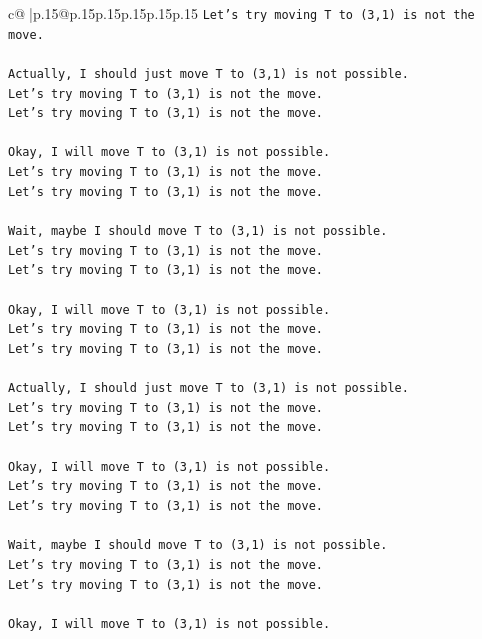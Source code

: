 \documentclass{article}
\begin{document}
{\begin{supertabular}{c@{$\;$}|p{.15\linewidth}@{}p{.15\linewidth}p{.15\linewidth}p{.15\linewidth}p{.15\linewidth}p{.15\linewidth}}
{{{\texttt{Let's try moving T to (3,1) is not the move.} \\
\\ 
\texttt{Actually, I should just move T to (3,1) is not possible.} \\
\texttt{Let's try moving T to (3,1) is not the move.} \\
\texttt{Let's try moving T to (3,1) is not the move.} \\
\\ 
\texttt{Okay, I will move T to (3,1) is not possible.} \\
\texttt{Let's try moving T to (3,1) is not the move.} \\
\texttt{Let's try moving T to (3,1) is not the move.} \\
\\ 
\texttt{Wait, maybe I should move T to (3,1) is not possible.} \\
\texttt{Let's try moving T to (3,1) is not the move.} \\
\texttt{Let's try moving T to (3,1) is not the move.} \\
\\ 
\texttt{Okay, I will move T to (3,1) is not possible.} \\
\texttt{Let's try moving T to (3,1) is not the move.} \\
\texttt{Let's try moving T to (3,1) is not the move.} \\
\\ 
\texttt{Actually, I should just move T to (3,1) is not possible.} \\
\texttt{Let's try moving T to (3,1) is not the move.} \\
\texttt{Let's try moving T to (3,1) is not the move.} \\
\\ 
\texttt{Okay, I will move T to (3,1) is not possible.} \\
\texttt{Let's try moving T to (3,1) is not the move.} \\
\texttt{Let's try moving T to (3,1) is not the move.} \\
\\ 
\texttt{Wait, maybe I should move T to (3,1) is not possible.} \\
\texttt{Let's try moving T to (3,1) is not the move.} \\
\texttt{Let's try moving T to (3,1) is not the move.} \\
\\ 
\texttt{Okay, I will move T to (3,1) is not possible.} \\
}}}
\end{supertabular}}
\end{document}
